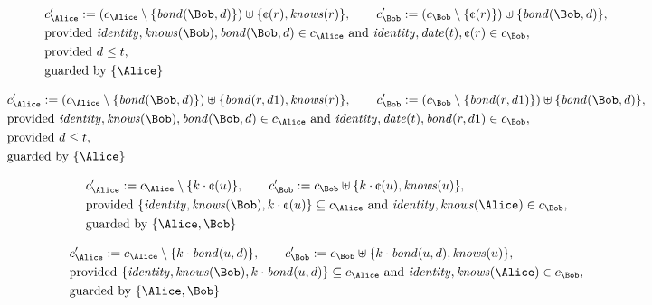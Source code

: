 \begin{align*}
&
c'_
{
\Alice
}
 := 
(c_
{
\Alice
}
 \setminus 
\{
\mathit{
bond
}
(
\Bob
,
d
)
\}
) \uplus 
\{
\text{\textcent}
(
r
)
,
\mathit{
knows
}
(
r
)
\}
, \qquad 
c'_
{
\Bob
}
 := 
(c_
{
\Bob
}
 \setminus 
\{
\text{\textcent}
(
r
)
\}
) \uplus 
\{
\mathit{
bond
}
(
\Bob
,
d
)
\}
,\\
&
\text{provided } 
\mathit{
identity
}
,
\mathit{
knows
}
(
\Bob
)
,
\mathit{
bond
}
(
\Bob
,
d
)
 \in c_
{
\Alice
}
 \text{ and } 
\mathit{
identity
}
,
\mathit{
date
}
(
t
)
,
\text{\textcent}
(
r
)
 \in c_
{
\Bob
}
,\\
&
\text{provided } 
d
\le
t
,\\
&
\text{guarded by } \{
\Alice
\}
\end{align*}

\begin{align*}
&
c'_
{
\Alice
}
 := 
(c_
{
\Alice
}
 \setminus 
\{
\mathit{
bond
}
(
\Bob
,
d
)
\}
) \uplus 
\{
\mathit{
bond
}
(
r
,
d1
)
,
\mathit{
knows
}
(
r
)
\}
, \qquad 
c'_
{
\Bob
}
 := 
(c_
{
\Bob
}
 \setminus 
\{
\mathit{
bond
}
(
r
,
d1
)
\}
) \uplus 
\{
\mathit{
bond
}
(
\Bob
,
d
)
\}
,\\
&
\text{provided } 
\mathit{
identity
}
,
\mathit{
knows
}
(
\Bob
)
,
\mathit{
bond
}
(
\Bob
,
d
)
 \in c_
{
\Alice
}
 \text{ and } 
\mathit{
identity
}
,
\mathit{
date
}
(
t
)
,
\mathit{
bond
}
(
r
,
d1
)
 \in c_
{
\Bob
}
,\\
&
\text{provided } 
d
\le
t
,\\
&
\text{guarded by } \{
\Alice
\}
\end{align*}

\begin{align*}
&
c'_
{
\Alice
}
 := 
c_
{
\Alice
}
 \setminus 
\{
k
\cdot
\text{\textcent}
(
u
)
\}
, \qquad 
c'_
{
\Bob
}
 := 
c_
{
\Bob
}
 \uplus 
\{
k
\cdot
\text{\textcent}
(
u
)
,
\mathit{
knows
}
(
u
)
\}
,\\
&
\text{provided } 
\{
\mathit{
identity
}
,
\mathit{
knows
}
(
\Bob
)
,
k
\cdot
\text{\textcent}
(
u
)
\}
 \subseteq c_
{
\Alice
}
 \text{ and } 
\mathit{
identity
}
,
\mathit{
knows
}
(
\Alice
)
 \in c_
{
\Bob
}
,\\
&
\text{guarded by } \{
\Alice
,
\Bob
\}
\end{align*}

\begin{align*}
&
c'_
{
\Alice
}
 := 
c_
{
\Alice
}
 \setminus 
\{
k
\cdot
\mathit{
bond
}
(
u
,
d
)
\}
, \qquad 
c'_
{
\Bob
}
 := 
c_
{
\Bob
}
 \uplus 
\{
k
\cdot
\mathit{
bond
}
(
u
,
d
)
,
\mathit{
knows
}
(
u
)
\}
,\\
&
\text{provided } 
\{
\mathit{
identity
}
,
\mathit{
knows
}
(
\Bob
)
,
k
\cdot
\mathit{
bond
}
(
u
,
d
)
\}
 \subseteq c_
{
\Alice
}
 \text{ and } 
\mathit{
identity
}
,
\mathit{
knows
}
(
\Alice
)
 \in c_
{
\Bob
}
,\\
&
\text{guarded by } \{
\Alice
,
\Bob
\}
\end{align*}
